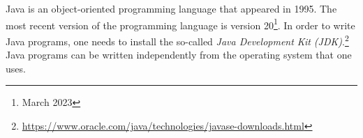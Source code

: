 Java is an object-oriented programming language that appeared in 
1995. The most recent version of the programming language is 
version 20\footnote{March 2023}. In order to write Java programs, 
one needs to install the so-called \emph{Java Development Kit 
(JDK)}.\footnote{\url{https://www.oracle.com/java/technologies/javase-downloads.html}}
Java programs can be written independently from the operating 
system that one uses.
